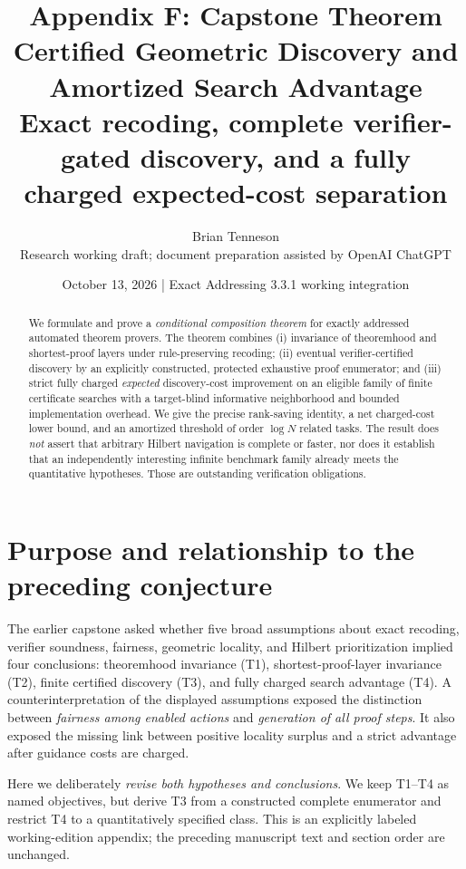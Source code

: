\documentclass[11pt,letterpaper]{article}
\title{\vspace{-1.2em}\textbf{Appendix F: Capstone Theorem}\\[0.24em]
\large Certified Geometric Discovery and Amortized Search Advantage\\[0.45em]
\normalsize Exact recoding, complete verifier-gated discovery, and a fully charged expected-cost separation}
\author{Brian Tenneson \\ Research working draft; document preparation assisted by OpenAI ChatGPT}
\date{October 13, 2026 \quad | \quad Exact Addressing 3.3.1 working integration}
\theoremstyle{definition}
\theoremstyle{remark}
\begin{document}
\renewcommand{\thesection}{F.\arabic{section}}
\maketitle
\vspace{-1.0em}
\begin{abstract}
We formulate and prove a \emph{conditional composition theorem} for exactly addressed automated theorem provers. The theorem combines (i) invariance of theoremhood and shortest-proof layers under rule-preserving recoding; (ii) eventual verifier-certified discovery by an explicitly constructed, protected exhaustive proof enumerator; and (iii) strict fully charged \emph{expected} discovery-cost improvement on an eligible family of finite certificate searches with a target-blind informative neighborhood and bounded implementation overhead. We give the precise rank-saving identity, a net charged-cost lower bound, and an amortized threshold of order $\log N$ related tasks. The result does \emph{not} assert that arbitrary Hilbert navigation is complete or faster, nor does it establish that an independently interesting infinite benchmark family already meets the quantitative hypotheses. Those are outstanding verification obligations.
\end{abstract}

\section{Purpose and relationship to the preceding conjecture}
The earlier capstone asked whether five broad assumptions about exact recoding, verifier soundness, fairness, geometric locality, and Hilbert prioritization implied four conclusions: theoremhood invariance (T1), shortest-proof-layer invariance (T2), finite certified discovery (T3), and fully charged search advantage (T4). A counterinterpretation of the displayed assumptions exposed the distinction between \emph{fairness among enabled actions} and \emph{generation of all proof steps}. It also exposed the missing link between positive locality surplus and a strict advantage after guidance costs are charged.

Here we deliberately \emph{revise both hypotheses and conclusions}. We keep T1--T4 as named objectives, but derive T3 from a constructed complete enumerator and restrict T4 to a quantitatively specified class. This is an explicitly labeled working-edition appendix; the preceding manuscript text and section order are unchanged.
\end{document}

